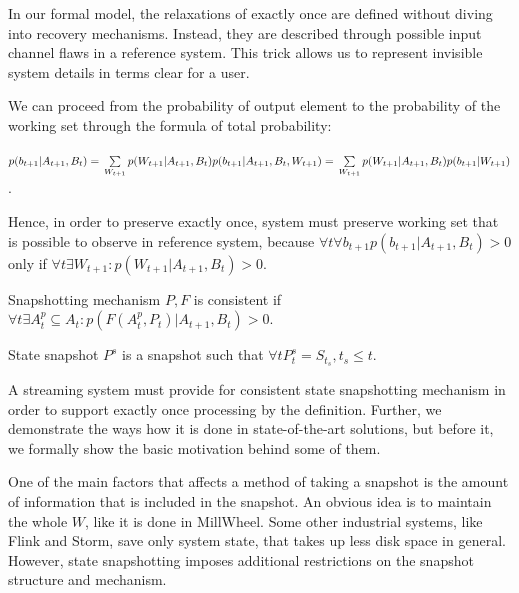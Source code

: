 In our formal model, the relaxations of exactly once are defined without diving into recovery mechanisms. Instead, they are described through possible input channel flaws in a reference system. This trick allows us to represent invisible system details in terms clear for a user.

We can proceed from the probability of output element to the probability of the working set through the formula of total probability:

$p(b_{t+1}|A_{t+1},B_t)=\\
\sum\limits_{W_{t+1}}p(W_{t+1}|A_{t+1},B_t)p(b_{t+1}|A_{t+1},B_t,W_{t+1})=\\
\sum\limits_{W_{t+1}}p(W_{t+1}|A_{t+1},B_t)p(b_{t+1}|W_{t+1})
$.

Hence, in order to preserve exactly once, system must preserve working set that is possible to observe in reference system, because $\forall{t} \forall{b_{t+1}} p(b_{t+1}|A_{t+1},B_t)>0$ only if $\forall{t} \exists{W_{t+1}}:p(W_{t+1}|A_{t+1},B_t)>0$.

\begin{definition}{Snapshotting mechanism $P,F$ is consistent}
if $\forall{t} \exists{A^{p}_t\subseteq{A_t}} : p(F(A^{p}_t,P_t)|A_{t+1},B_t)>0$.
\end{definition}


\begin{definition}{State snapshot}
$P^{s}$ is a snapshot such that $\forall{t} P^{s}_t = S_{t_s},t_s \leq t$.
\end{definition}

A streaming system must provide for consistent state snapshotting mechanism in order to support exactly once processing by the definition. Further, we demonstrate the ways how it is done in state-of-the-art solutions, but before it, we formally show the basic motivation behind some of them. 

One of the main factors that affects a method of taking a snapshot is the amount of information that is included in the snapshot. An obvious idea is to maintain the whole $W$, like it is done in MillWheel. Some other industrial systems, like Flink and Storm, save only system state, that takes up less disk space in general. However, state snapshotting imposes additional restrictions on the snapshot structure and mechanism.

